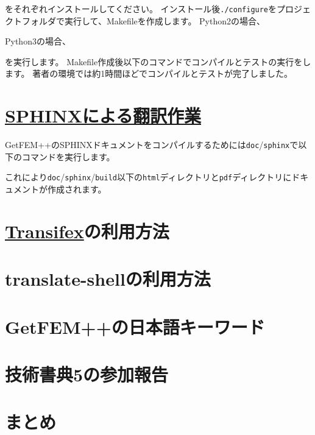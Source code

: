 \documentclass{../../style/ltjoc}
\begin{document}
をそれぞれインストールしてください。
インストール後\texttt{./configure}をプロジェクトフォルダで実行して、Makefileを作成します。
Python2の場合、
\begin{shbox}
\end{shbox}
Python3の場合、
\begin{shbox}
\end{shbox}
を実行します。
Makefile作成後以下のコマンドでコンパイルとテストの実行をします。
著者の環境では約1時間ほどでコンパイルとテストが完了しました。
\begin{shbox}
\end{shbox}

\section{\href{http://www.sphinx-doc.org/ja/stable/intl.html}{SPHINXによる翻訳作業}}
GetFEM++のSPHINXドキュメントをコンパイルするためには\texttt{doc}/\texttt{sphinx}で以下のコマンドを実行します。
\begin{shbox}
\end{shbox}
これにより\texttt{doc}/\texttt{sphinx}/\texttt{build}以下の\texttt{html}ディレクトリと\texttt{pdf}ディレクトリにドキュメントが作成されます。

\section{\href{https://www.transifex.com}{Transifex}の利用方法}
\section{translate-shellの利用方法}
\section{GetFEM++の日本語キーワード}
\section{技術書典5の参加報告}
\section{まとめ}
\end{document}
